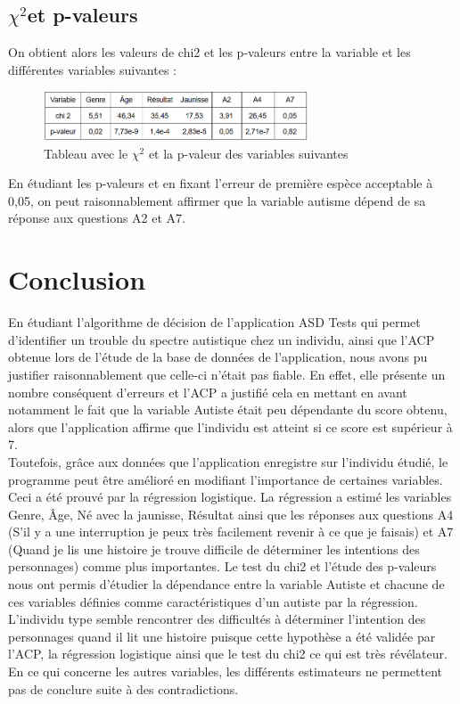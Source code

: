 \documentclass[12,french]{report}
\begin{document}
\section{\boldmath$\displaystyle\chi^2 $\unboldmath et p-valeurs}
On obtient alors les valeurs de chi2 et les p-valeurs entre la variable et les différentes variables suivantes :\\

\begin{figure}[H]
	\center
	\includegraphics[width=0.7\textwidth]{./Images/30}
	\caption{Tableau avec le $\chi^2$ et la p-valeur des variables suivantes}
\end{figure}\vspace{0.1cm}

En étudiant les p-valeurs et en fixant l’erreur de première espèce acceptable à 0,05, on peut raisonnablement affirmer que la variable autisme dépend de sa réponse aux questions A2 et A7.

\chapter*{Conclusion}

En étudiant l’algorithme de décision de l’application ASD Tests qui permet d’identifier un trouble du spectre autistique chez un individu, ainsi que l’ACP obtenue lors de l’étude de la base de données de l’application, nous avons pu justifier raisonnablement que celle-ci n’était pas fiable. En effet, elle présente un nombre conséquent d’erreurs et l’ACP a justifié cela en mettant en avant notamment le fait que la variable Autiste était peu dépendante du score obtenu, alors que l’application affirme que l’individu est atteint si ce score est supérieur à 7.\\

    Toutefois, grâce aux données que l’application enregistre sur l’individu étudié, le programme peut être amélioré en modifiant l’importance de certaines variables. Ceci a été prouvé par la régression logistique. La régression a estimé les variables Genre, Âge, Né avec la jaunisse, Résultat ainsi que les réponses aux questions A4 (S’il y a une interruption je peux très facilement revenir à ce que je faisais) et A7 (Quand je lis une histoire je trouve difficile de déterminer les intentions des personnages) comme plus importantes. Le test du chi2 et l’étude des p-valeurs nous ont permis d’étudier la dépendance entre la variable Autiste et chacune de ces variables définies comme caractéristiques d’un autiste par la régression. L’individu type semble rencontrer des difficultés à déterminer l’intention des personnages quand il lit une histoire puisque cette hypothèse a été validée par l’ACP, la régression logistique ainsi que le test du chi2 ce qui est très révélateur. En ce qui concerne les autres variables, les différents estimateurs ne permettent pas de conclure suite à des contradictions.\\
\end{document}
